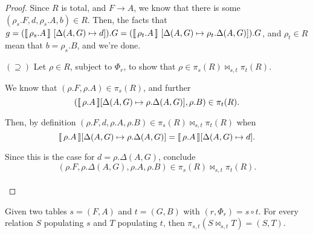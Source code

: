 \begin{proof}
  Since $R$ is total, and $F \longrightarrow A$, we know that there is
  some $(\rho_s.F, d, \rho_s.A, b) \in R$. Then, the facts that
  $g = (\llbracket\,\rho_s.A\,\rrbracket~[\Delta(A,G) \mapsto d]).G =
  (\llbracket\,\rho_t.A\,\rrbracket~[\Delta(A,G) \mapsto \rho_t.\Delta(A,G)]).G$, and
  $\rho_t \in R$ mean that $b = \rho_s.B$, and we're done. \hfill \checkmark

\item[$(\supseteq)$] Let $\rho \in R$, subject to $\Phi_r$, to show
  that $\rho \in \pi_s(R) \bowtie_{s,t} \pi_t(R)$.

  We know that $(\rho.F, \rho.A) \in \pi_s(R)$, and further
  \[(\llbracket\,\rho.A\,\rrbracket[\Delta(A,G) \mapsto \rho.\Delta(A,G)],\rho.B) \in
  \pi_t(R).\]

  Then, by definition
  $(\rho.F, d, \rho.A, \rho.B) \in \pi_s(R) \bowtie_{s,t} \pi_t(R)$ when
  \[\llbracket\,\rho.A\,\rrbracket[\Delta(A,G) \mapsto \rho.\Delta(A,G)]
    = \llbracket\,\rho.A\,\rrbracket[\Delta(A,G) \mapsto d].\]

  Since this is the case for $d = \rho.\Delta(A,G)$, conclude
  \[(\rho.F, \rho.\Delta(A,G), \rho.A, \rho.B) \in \pi_s(R)
    \bowtie_{s,t} \pi_t(R).\]
  \mbox{} \hfill \checkmark\\\mbox{}
\end{proof}

\begin{proposition}
  \label{prop:proj-join}
  Given two tables $s = (F,A)$ and $t = (G,B)$ with
  $(r, \Phi_r) = s \circ t$. For every relation $S$ populating $s$ and
  $T$ populating $t$, then $\pi_{s,t}(S \bowtie_{s,t} T) = (S,T)$.
\end{proposition}

